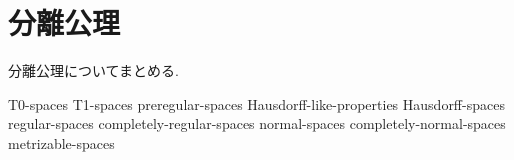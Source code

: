 \documentclass[uplatex, dvipdfmx, a4paper, 12pt, class=jsbook, crop=false]{standalone}
\begin{document}
\chapter{分離公理}
\label{chap:separation-axioms}

分離公理についてまとめる.

{T0-spaces}
{T1-spaces}
{preregular-spaces}
{Hausdorff-like-properties}
{Hausdorff-spaces}
{regular-spaces}
{completely-regular-spaces}
{normal-spaces}
{completely-normal-spaces}
{metrizable-spaces}
\end{document}
